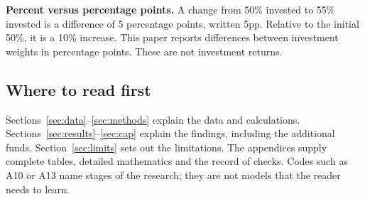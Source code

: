 \textbf{Percent versus percentage points.} A change from 50\% invested to 55\% invested is a difference of 5 percentage points, written 5pp. Relative to the initial 50\%, it is a 10\% increase. This paper reports differences between investment weights in percentage points. These are not investment returns.

\subsection*{Where to read first}
Sections~\ref{sec:data}--\ref{sec:methods} explain the data and calculations. Sections~\ref{sec:results}--\ref{sec:cap} explain the findings, including the additional funds. Section~\ref{sec:limits} sets out the limitations. The appendices supply complete tables, detailed mathematics and the record of checks. Codes such as A10 or A13 name stages of the research; they are not models that the reader needs to learn.
